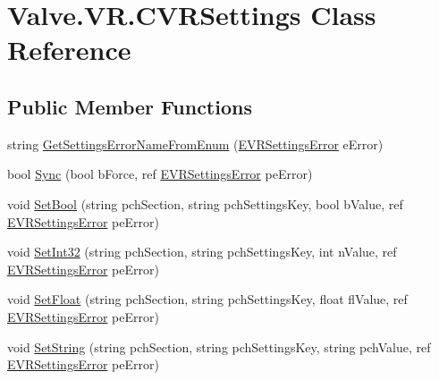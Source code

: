\hypertarget{class_valve_1_1_v_r_1_1_c_v_r_settings}{}\section{Valve.\+V\+R.\+C\+V\+R\+Settings Class Reference}
\label{class_valve_1_1_v_r_1_1_c_v_r_settings}
\subsection*{Public Member Functions}
\begin{DoxyCompactItemize}
\item 
string \mbox{\hyperlink{class_valve_1_1_v_r_1_1_c_v_r_settings_ac84c519d89bb27418816853dd20b093f}{Get\+Settings\+Error\+Name\+From\+Enum}} (\mbox{\hyperlink{namespace_valve_1_1_v_r_aeab7722b211afc3885ed77faa931291f}{E\+V\+R\+Settings\+Error}} e\+Error)
\item 
bool \mbox{\hyperlink{class_valve_1_1_v_r_1_1_c_v_r_settings_a49ec935dcd62b1292d5a2c05daecdff6}{Sync}} (bool b\+Force, ref \mbox{\hyperlink{namespace_valve_1_1_v_r_aeab7722b211afc3885ed77faa931291f}{E\+V\+R\+Settings\+Error}} pe\+Error)
\item 
void \mbox{\hyperlink{class_valve_1_1_v_r_1_1_c_v_r_settings_af1b10a962dbdd60237bbe8eccd7cbbc2}{Set\+Bool}} (string pch\+Section, string pch\+Settings\+Key, bool b\+Value, ref \mbox{\hyperlink{namespace_valve_1_1_v_r_aeab7722b211afc3885ed77faa931291f}{E\+V\+R\+Settings\+Error}} pe\+Error)
\item 
void \mbox{\hyperlink{class_valve_1_1_v_r_1_1_c_v_r_settings_a1d0d2179221adecadb03b36339513e0d}{Set\+Int32}} (string pch\+Section, string pch\+Settings\+Key, int n\+Value, ref \mbox{\hyperlink{namespace_valve_1_1_v_r_aeab7722b211afc3885ed77faa931291f}{E\+V\+R\+Settings\+Error}} pe\+Error)
\item 
void \mbox{\hyperlink{class_valve_1_1_v_r_1_1_c_v_r_settings_a1a193ea418f97a02c739c0f7fd17fc03}{Set\+Float}} (string pch\+Section, string pch\+Settings\+Key, float fl\+Value, ref \mbox{\hyperlink{namespace_valve_1_1_v_r_aeab7722b211afc3885ed77faa931291f}{E\+V\+R\+Settings\+Error}} pe\+Error)
\item 
void \mbox{\hyperlink{class_valve_1_1_v_r_1_1_c_v_r_settings_a797ac0f3fbaca82794b685f4e70a1486}{Set\+String}} (string pch\+Section, string pch\+Settings\+Key, string pch\+Value, ref \mbox{\hyperlink{namespace_valve_1_1_v_r_aeab7722b211afc3885ed77faa931291f}{E\+V\+R\+Settings\+Error}} pe\+Error)
\item 

\end{DoxyCompactItemize}
